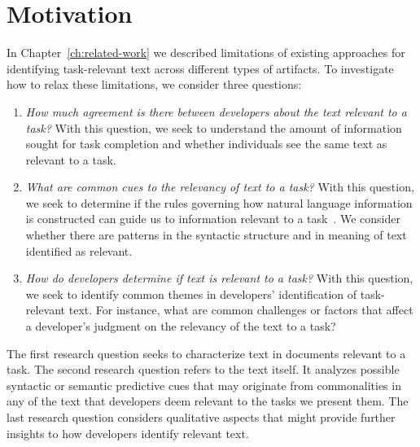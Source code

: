 \section{Motivation}
\label{cp3:method}



In Chapter~\ref{ch:related-work} we described limitations 
of existing approaches for identifying task-relevant 
text across different types of artifacts. 
To investigate how to relax these limitations, we consider three questions:


\begin{enumerate}[label=\textit{RQ\arabic*},leftmargin=*]

    \item \textit{How much agreement is there between developers about the text
    relevant to a task?} With this question, we seek to understand
    the amount of information sought for task completion
    and whether individuals see the same text as
    relevant to a task.

    \item \textit{What are common cues to the relevancy of text to a task?}
    With this question, we seek to determine if the rules governing how natural language information
    is constructed can guide us to information relevant to a task~\cite{Kintsch1978a}.
    We consider whether there
    are patterns in the  syntactic structure and in meaning of text identified as relevant.

    \item \textit{How do developers determine if text is relevant to a task?}
    With this question, we seek to identify common themes in developers' identification of task-relevant text. For instance, what are common challenges or factors that affect a developer's judgment on the relevancy of the text to a task?

\end{enumerate}



The first research question seeks to characterize text
in documents relevant to a task.
The second research question refers to the text itself.
It analyzes possible syntactic or semantic
predictive cues that may originate from commonalities in any of the text that developers deem relevant to the tasks we present them.
The last research question considers qualitative aspects that might provide
further insights to how developers identify relevant text.

